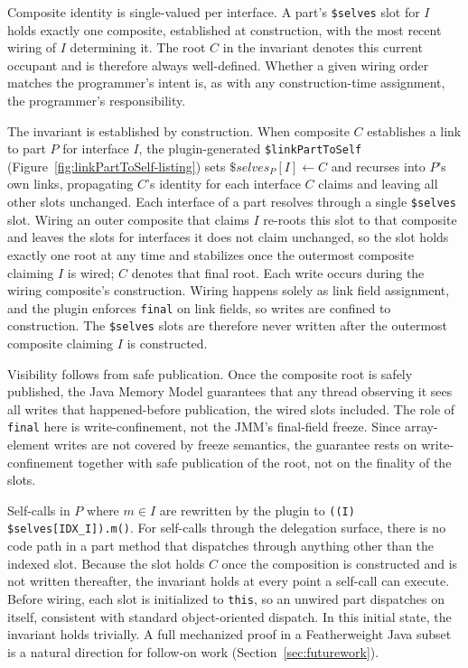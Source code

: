 \documentclass[acmsmall,screen,review,anonymous]{acmart}
\theoremstyle{acmplain}
\newcommand{\code}[1]{\texttt{#1}}
\begin{document}
Composite identity is single-valued per interface. A part's \code{\$selves} slot for $I$ holds exactly one composite, established
at construction, with the most recent wiring of $I$ determining it. The root $C$ in the invariant denotes this current occupant
and is therefore always well-defined. Whether a given wiring order matches the programmer's intent is, as with any construction-time
assignment, the programmer's responsibility.

The invariant is established by construction. When composite $C$ establishes
a link to part $P$ for interface $I$, the plugin-generated
\code{\$linkPartToSelf} (Figure~\ref{fig:linkPartToSelf-listing}) sets $\$\mathit{selves}_P[I] \leftarrow C$ and
recurses into $P$'s own links, propagating $C$'s identity for each interface
$C$ claims and leaving all other slots unchanged. Each interface of a part resolves
through a single \code{\$selves} slot. Wiring an outer composite that claims
$I$ re-roots this slot to that composite and leaves the slots for interfaces it
does not claim unchanged, so the slot holds exactly one root at any time and
stabilizes once the outermost composite claiming $I$ is wired; $C$ denotes that
final root. Each write occurs during the wiring composite's construction. Wiring happens solely
as link field assignment, and the plugin enforces \code{final} on link
fields, so writes are confined to construction. The \code{\$selves} slots are therefore never
written after the outermost composite claiming $I$ is constructed.

Visibility follows from safe publication. Once the composite root is safely published, the
Java Memory Model guarantees that any thread observing it sees all writes that
happened-before publication, the wired slots included. The role of \code{final}
here is write-confinement, not the JMM's final-field freeze. Since array-element writes
are not covered by freeze semantics, the guarantee rests on write-confinement
together with safe publication of the root, not on the finality of the slots.

Self-calls in $P$ where $m \in I$ are rewritten by the plugin to \code{((I)\,\$selves[IDX\_I]).m()}.
For self-calls through the delegation surface, there is no code path in a
part method that dispatches through anything other than the indexed
slot. Because the slot holds $C$ once the composition is constructed and is not
written thereafter, the invariant holds at every point a self-call can execute.
Before wiring, each slot is initialized to \code{this}, so an unwired part
dispatches on itself, consistent with standard object-oriented dispatch. In this
initial state, the invariant holds trivially. A full mechanized proof in a Featherweight
Java subset is a natural direction for follow-on work (Section~\ref{sec:futurework}).
\end{document}
